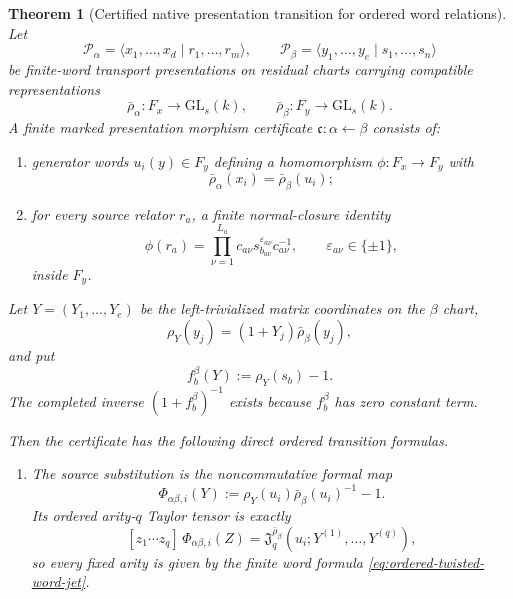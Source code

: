 \documentclass[11pt]{article}
\newtheorem{theorem}{Theorem}[section]
\theoremstyle{definition}
\begin{document}
\begin{theorem}[Certified native presentation transition for ordered word relations]\label{thm:certified-native-ordered-transition}
Let
\[
 \mathcal P_\alpha=\langle x_1,\ldots,x_d\mid r_1,\ldots,r_m\rangle,
 \qquad
 \mathcal P_\beta=\langle y_1,\ldots,y_e\mid s_1,\ldots,s_n\rangle
\]
be finite-word transport presentations on residual charts carrying compatible
representations
\[
 \bar\rho_\alpha:F_x\to \mathrm{GL}_s(k),
 \qquad
 \bar\rho_\beta:F_y\to \mathrm{GL}_s(k).
\]
A \emph{finite marked presentation morphism certificate}
$\mathfrak c:\alpha\leftarrow\beta$ consists of:
\begin{enumerate}[label=\textnormal{(\alph*)}]
\item generator words $u_i(y)\in F_y$ defining a homomorphism
$\phi:F_x\to F_y$ with
\[
 \bar\rho_\alpha(x_i)=\bar\rho_\beta(u_i);
\]
\item for every source relator $r_a$, a finite normal-closure identity
\begin{equation}\label{eq:certified-relator-identity}
 \phi(r_a)
 =\prod_{\nu=1}^{L_a}
 c_{a\nu}s_{b_{a\nu}}^{\varepsilon_{a\nu}}c_{a\nu}^{-1},
 \qquad
 \varepsilon_{a\nu}\in\{\pm1\},
\end{equation}
inside $F_y$.
\end{enumerate}
Let $Y=(Y_1,\ldots,Y_e)$ be the left-trivialized matrix coordinates on the
$\beta$ chart,
\[
 \rho_Y(y_j)=(1+Y_j)\bar\rho_\beta(y_j),
\]
and put
\[
 f_b^\beta(Y):=\rho_Y(s_b)-1.
\]
The completed inverse $(1+f_b^\beta)^{-1}$ exists because
$f_b^\beta$ has zero constant term.

Then the certificate has the following direct ordered transition formulas.
\begin{enumerate}[label=\textnormal{(\roman*)}]
\item The source substitution is the noncommutative formal map
\begin{equation}\label{eq:certified-native-source-substitution}
 \boxed{
 \Phi_{\alpha\beta,i}(Y)
 :=\rho_Y(u_i)\bar\rho_\beta(u_i)^{-1}-1.
 }
\end{equation}
Its ordered arity-$q$ Taylor tensor is exactly
\begin{equation}\label{eq:certified-source-ordered-tensor}
 [z_1\cdots z_q]\,\Phi_{\alpha\beta,i}(Z)
 =\mathfrak J_q^{\bar\rho_\beta}
   (u_i;Y^{(1)},\ldots,Y^{(q)}),
\end{equation}
so every fixed arity is given by the finite word formula
\eqref{eq:ordered-twisted-word-jet}.


\end{enumerate}
\end{theorem}
\end{document}
